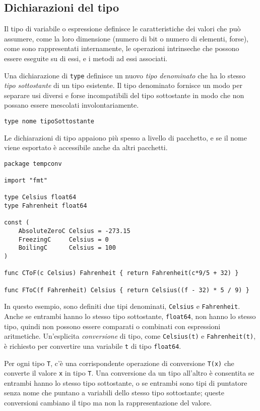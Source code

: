 \documentclass[../../thesis.tex]{subfiles}
\begin{document}
    \subsection{Dichiarazioni del tipo}\label{subsec:dichiarazioni-del-tipo}
    Il tipo di variabile o espressione definisce le caratteristiche dei valori che può assumere, come la loro dimensione (numero di bit o numero di elementi, forse), come sono rappresentati internamente, le operazioni intrinseche che possono essere eseguite su di essi, e i metodi ad essi associati.
    \hfill \vspace{12pt}

    Una dichiarazione di \verb"type" definisce un nuovo \textit{tipo denominato} che ha lo stesso \textit{tipo sottostante} di un tipo esistente.
    Il tipo denominato fornisce un modo per separare usi diversi e forse incompatibili del tipo sottostante in modo che non possano essere mescolati involontariamente.
    \begin{lstlisting}[label={lst:lstlisting1-5.1}]
type nome tipoSottostante
    \end{lstlisting}
    Le dichiarazioni di tipo appaiono più spesso a livello di pacchetto, e se il nome viene esportato è accessibile anche da altri pacchetti.
    \begin{lstlisting}[frame = single,label={lst:lstlisting1-5.2}]
package tempconv

import "fmt"

type Celsius float64
type Fahrenheit float64

const (
    AbsoluteZeroC Celsius = -273.15
    FreezingC	  Celsius = 0
    BoilingC	  Celsius = 100
)

func CToF(c Celsius) Fahrenheit { return Fahrenheit(c*9/5 + 32) }

func FToC(f Fahrenheit) Celsius { return Celsius((f - 32) * 5 / 9) }
    \end{lstlisting}
    In questo esempio, sono definiti due tipi denominati, \verb"Celsius" e \verb"Fahrenheit".
    Anche se entrambi hanno lo stesso tipo sottostante, \verb"float64", non hanno lo stesso tipo, quindi non possono essere comparati o combinati con espressioni aritmetiche.
    Un'esplicita \textit{conversione} di tipo, come \verb"Celsius(t)" e \verb"Fahrenheit(t)", è richiesto per convertire una variabile \verb"t" di tipo \verb"float64".
    \hfill \vspace{12pt}

    Per ogni tipo \verb"T", c'è una corrispondente operazione di conversione \verb"T(x)" che converte il valore \verb"x" in tipo \verb"T".
    Una conversione da un tipo all'altro è consentita se entrambi hanno lo stesso tipo sottostante, o se entrambi sono tipi di puntatore senza nome che puntano a variabili dello stesso tipo sottostante;
    queste conversioni cambiano il tipo ma non la rappresentazione del valore.
    \hfill \vspace{12pt}
\end{document}
